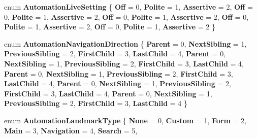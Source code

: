 \begin{DoxyCompactItemize}
enum {\bfseries Automation\+Live\+Setting} \{ \newline
{\bfseries Off} = 0, 
{\bfseries Polite} = 1, 
{\bfseries Assertive} = 2, 
{\bfseries Off} = 0, 
\newline
{\bfseries Polite} = 1, 
{\bfseries Assertive} = 2, 
{\bfseries Off} = 0, 
{\bfseries Polite} = 1, 
\newline
{\bfseries Assertive} = 2, 
{\bfseries Off} = 0, 
{\bfseries Polite} = 1, 
{\bfseries Assertive} = 2, 
\newline
{\bfseries Off} = 0, 
{\bfseries Polite} = 1, 
{\bfseries Assertive} = 2
 \}
\item 
\mbox{\label{namespace_windows_1_1_u_i_1_1_xaml_1_1_automation_1_1_peers_a9b8626451e301972334ca5697b978934}} 
enum {\bfseries Automation\+Navigation\+Direction} \{ \newline
{\bfseries Parent} = 0, 
{\bfseries Next\+Sibling} = 1, 
{\bfseries Previous\+Sibling} = 2, 
{\bfseries First\+Child} = 3, 
\newline
{\bfseries Last\+Child} = 4, 
{\bfseries Parent} = 0, 
{\bfseries Next\+Sibling} = 1, 
{\bfseries Previous\+Sibling} = 2, 
\newline
{\bfseries First\+Child} = 3, 
{\bfseries Last\+Child} = 4, 
{\bfseries Parent} = 0, 
{\bfseries Next\+Sibling} = 1, 
\newline
{\bfseries Previous\+Sibling} = 2, 
{\bfseries First\+Child} = 3, 
{\bfseries Last\+Child} = 4, 
{\bfseries Parent} = 0, 
\newline
{\bfseries Next\+Sibling} = 1, 
{\bfseries Previous\+Sibling} = 2, 
{\bfseries First\+Child} = 3, 
{\bfseries Last\+Child} = 4, 
\newline
{\bfseries Parent} = 0, 
{\bfseries Next\+Sibling} = 1, 
{\bfseries Previous\+Sibling} = 2, 
{\bfseries First\+Child} = 3, 
\newline
{\bfseries Last\+Child} = 4
 \}
\item 
\mbox{\label{namespace_windows_1_1_u_i_1_1_xaml_1_1_automation_1_1_peers_a7841d4ce398126516a6081408b8e9c0d}} 
enum {\bfseries Automation\+Landmark\+Type} \{ \newline
{\bfseries None} = 0, 
{\bfseries Custom} = 1, 
{\bfseries Form} = 2, 
{\bfseries Main} = 3, 
\newline
{\bfseries Navigation} = 4, 
{\bfseries Search} = 5, 

\end{DoxyCompactItemize}
